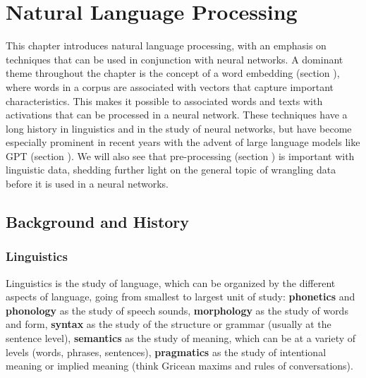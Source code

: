 \chapter{Natural Language Processing}\label{ch_nlp}

This chapter introduces natural language processing, with an emphasis on techniques that can be used in conjunction with neural networks. A dominant theme throughout the chapter is the concept of a word embedding (section ), where words in a corpus are associated with vectors that capture important characteristics. This makes it possible to associated words and texts with activations that can be processed in a neural network. These techniques have a long history in linguistics and in the study of neural networks, but have become especially prominent in recent years with the advent of large language models like GPT (section ). We will also see that pre-processing (section ) is important with linguistic data, shedding further light on the general topic of wrangling data before it is used in a neural networks.


\section{Background and History}

\subsection{Linguistics}

Linguistics is the study of language, which can be organized by the different aspects of language, going from smallest to largest unit of study: \textbf{phonetics} and \textbf{phonology} as the study of speech sounds, \textbf{morphology} as the study of words and form, \textbf{syntax} as the study of the structure or grammar (usually at the sentence level), \textbf{semantics} as the study of meaning, which can be at a variety of levels (words, phrases, sentences), \textbf{pragmatics} as the study of intentional meaning or implied meaning (think Gricean maxims and rules of conversations). 

